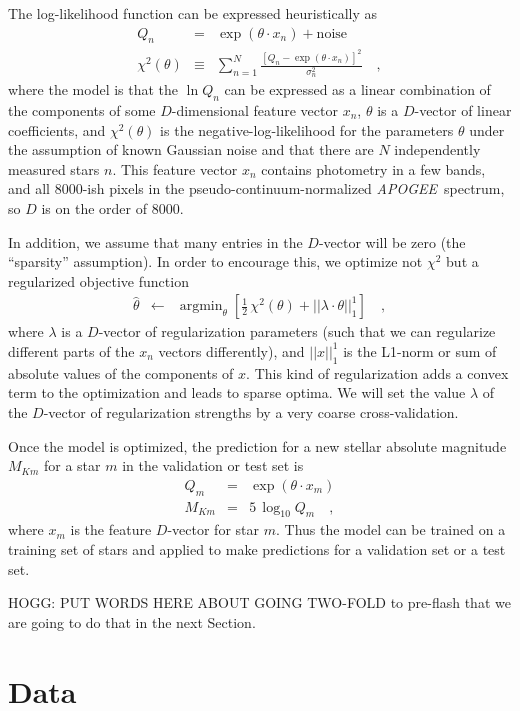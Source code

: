 \documentclass[modern]{aastex62}
\newcommand{\acronym}[1]{{\small{#1}}}
\newcommand{\project}[1]{\textsl{#1}}
\newcommand{\apogee}{\project{\acronym{APOGEE}}}
\DeclareMathOperator*{\argmin}{argmin}
\begin{document}
The log-likelihood function can be expressed heuristically as
\begin{eqnarray}
Q_n &=& \exp(\theta\cdot x_n) + \mbox{noise}
\\
\chi^2(\theta) &\equiv& \sum_{n=1}^N \frac{[Q_n - \exp(\theta\cdot x_n)]^2}{\sigma_n^2}
\quad ,
\end{eqnarray}
where
the model is that the $\ln Q_n$ can be expressed as a linear combination of the components
of some $D$-dimensional feature vector $x_n$,
$\theta$ is a $D$-vector of linear coefficients,
and $\chi^2(\theta)$ is the negative-log-likelihood for the parameters $\theta$
under the assumption of known Gaussian noise and
that there are $N$ independently measured stars $n$.
This feature vector $x_n$ contains photometry in a few bands, and all 8000-ish pixels
in the pseudo-continuum-normalized \apogee\ spectrum, so $D$ is on the order of 8000.

In addition, we assume that many entries in the $D$-vector will be zero
(the ``sparsity'' assumption).
In order to encourage this, we optimize not $\chi^2$ but a regularized objective function
\begin{eqnarray}
\hat{\theta} &\leftarrow& \argmin_{\theta}\left[\frac{1}{2}\,\chi^2(\theta) + ||\lambda\cdot\theta||_1^1\right]
\quad ,
\end{eqnarray}
where
$\lambda$ is a $D$-vector of regularization parameters (such that we can regularize
different parts of the $x_n$ vectors differently),
and $||x||_1^1$ is the L1-norm or sum of absolute values of the components of $x$.
This kind of regularization adds a convex term to the optimization and leads to
sparse optima.
We will set the value $\lambda$ of the $D$-vector of regularization strengths by a
very coarse cross-validation.

Once the model is optimized, the prediction for a new stellar absolute magnitude
$M_{Km}$ for a star $m$ in the validation or test set is
\begin{eqnarray}
Q_m &=& \exp(\theta\cdot x_m)
\\
M_{Km} &=& 5\,\log_{10} Q_m
\quad ,
\end{eqnarray}
where $x_m$ is the feature $D$-vector for star $m$.
Thus the model can be trained on a training set of stars and applied to make
predictions for a validation set or a test set.

HOGG: PUT WORDS HERE ABOUT GOING TWO-FOLD to pre-flash that we are going to do that
in the next Section.

\section{Data}
\end{document}
